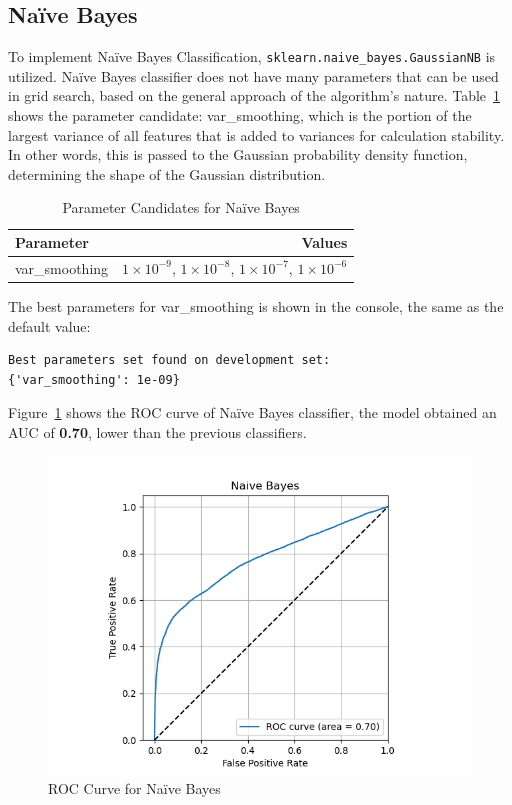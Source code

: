 \subsection{Na\"ive Bayes}

To implement Na\"ive Bayes Classification, \texttt{sklearn.naive\_bayes.GaussianNB} is utilized. Na\"ive Bayes classifier does not have many parameters that can be used in grid search, based on the general approach of the algorithm's nature. Table~\ref{tab:parameters-nb} shows the parameter candidate: var\_smoothing, which is the portion of the largest variance of all features that is added to variances for calculation stability. In other words, this is passed to the Gaussian probability density function, determining the shape of the Gaussian distribution.

\begin{table}[h]
\centering
\begin{tabular}{|l|r|}
\hline
\textbf{Parameter} & \textbf{Values}                         \\ \hline
var\_smoothing     & \(1 \times 10^{-9}\), \(1 \times 10^{-8}\), \(1 \times 10^{-7}\), \(1 \times 10^{-6}\) \\ \hline
\end{tabular}
\caption{Parameter Candidates for Na\"ive Bayes}
\label{tab:parameters-nb}
\end{table}

The best parameters for var\_smoothing is shown in the console, the same as the default value:

\begin{verbatim}
Best parameters set found on development set:
{'var_smoothing': 1e-09}
\end{verbatim}

Figure~\ref{fig:roc-nb} shows the ROC curve of Na\"ive Bayes classifier, the model obtained an AUC of \textbf{0.70}, lower than the previous classifiers.

\begin{figure}
    \centering
    \includegraphics[width=1\linewidth]{docs//assets/individual_roc_curve_Naive Bayes.png}
    \caption{ROC Curve for Na\"ive Bayes}
    \label{fig:roc-nb}
\end{figure}

